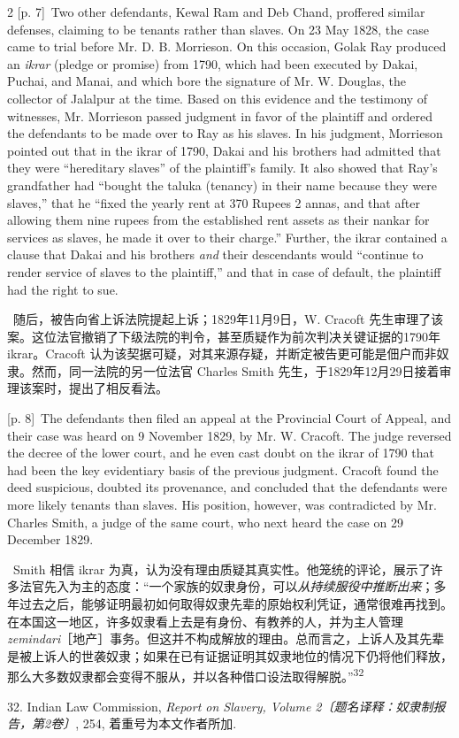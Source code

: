 \documentclass[10pt,a4paper]{article}
\begin{document}
\begin{paracol}{2}
{\scriptsize\color{gray} [p. 7]}\ Two other defendants, Kewal Ram and Deb Chand, proffered similar defenses, claiming to be tenants rather than slaves. On 23 May 1828, the case came to trial before Mr. D. B. Morrieson. On this occasion, Golak Ray produced an \textit{ikrar} (pledge or promise) from 1790, which had been executed by Dakai, Puchai, and Manai, and which bore the signature of Mr. W. Douglas, the collector of Jalalpur at the time. Based on this evidence and the testimony of witnesses, Mr. Morrieson passed judgment in favor of the plaintiff and ordered the defendants to be made over to Ray as his slaves. In his judgment, Morrieson pointed out that in the ikrar of 1790, Dakai and his brothers had admitted that they were “hereditary slaves” of the plaintiff’s family. It also showed that Ray’s grandfather had “bought the taluka (tenancy) in their name because they were slaves,” that he “fixed the yearly rent at 370 Rupees 2 annas, and that after allowing them nine rupees from the established rent assets as their nankar for services as slaves, he made it over to their charge.” Further, the ikrar contained a clause that Dakai and his brothers \textit{and} their descendants would “continue to render service of slaves to the plaintiff,” and that in case of default, the plaintiff had the right to sue.\par
\switchcolumn*
{\scriptsize\color{gray} [p. 8]}\ 随后，被告向省上诉法院提起上诉；1829年11月9日，W. Cracoft 先生审理了该案。这位法官撤销了下级法院的判令，甚至质疑作为前次判决关键证据的1790年 ikrar。Cracoft 认为该契据可疑，对其来源存疑，并断定被告更可能是佃户而非奴隶。然而，同一法院的另一位法官 Charles Smith 先生，于1829年12月29日接着审理该案时，提出了相反看法。\par
\switchcolumn
{\scriptsize\color{gray} [p. 8]}\ The defendants then filed an appeal at the Provincial Court of Appeal, and their case was heard on 9 November 1829, by Mr. W. Cracoft. The judge reversed the decree of the lower court, and he even cast doubt on the ikrar of 1790 that had been the key evidentiary basis of the previous judgment. Cracoft found the deed suspicious, doubted its provenance, and concluded that the defendants were more likely tenants than slaves. His position, however, was contradicted by Mr. Charles Smith, a judge of the same court, who next heard the case on 29 December 1829.\par
\switchcolumn*
{\scriptsize\color{gray} [p. 8]}\ Smith 相信 ikrar 为真，认为没有理由质疑其真实性。他笼统的评论，展示了许多法官先入为主的态度：“一个家族的奴隶身份，可以\textit{从持续服役中推断出来}；多年过去之后，能够证明最初如何取得奴隶先辈的原始权利凭证，通常很难再找到。在本国这一地区，许多奴隶看上去是有身份、有教养的人，并为主人管理\textit{zemindari}［地产］事务。但这并不构成解放的理由。总而言之，上诉人及其先辈是被上诉人的世袭奴隶；如果在已有证据证明其奴隶地位的情况下仍将他们释放，那么大多数奴隶都会变得不服从，并以各种借口设法取得解脱。”\nobreak\textsuperscript{32}\par{\small 32. Indian Law Commission, \textit{Report on Slavery, Volume 2〔题名译释：奴隶制报告，第2卷〕}, 254, 着重号为本文作者所加.\par}

\end{paracol}
\end{document}
